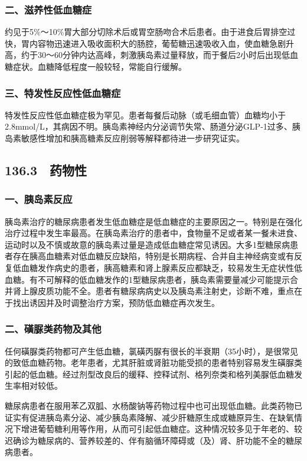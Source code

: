 \subsubsection{二、滋养性低血糖症}

约见于5\%～10\%胃大部分切除术后或胃空肠吻合术后患者。由于进食后胃排空过快，胃内容物迅速进入吸收面积大的肠腔，葡萄糖迅速吸收入血，使血糖急剧升高，约于30～60分钟内达高峰，刺激胰岛素过量释放，而于餐后2小时后出现低血糖症状。血糖降低程度一般较轻，常能自行缓解。

\subsubsection{三、特发性反应性低血糖症}

特发性反应性低血糖症极为罕见。患者每餐后动脉（或毛细血管）血糖均小于2.8mmol/L，其病因不明。胰岛素神经内分泌调节失常、肠道分泌GLP-1过多、胰岛素敏感性增加和胰高糖素反应削弱等解释都待进一步研究证实。

\subsection{136.3　药物性}

\subsubsection{一、胰岛素反应}

胰岛素治疗的糖尿病患者发生低血糖症是低血糖症的主要原因之一。特别是在强化治疗过程中发生率最高。在胰岛素治疗的患者中，食物量不足或者某一餐未进食、运动时以及不慎或故意的胰岛素过量是造成低血糖症常见诱因。大多1型糖尿病患者存在胰高血糖素对低血糖反应缺陷，特别是长期病程、合并自主神经病变或有反复低血糖发作病史的患者，胰高糖素和肾上腺素反应都缺乏，较易发生无症状性低血糖。有不可解释的低血糖发作的1型糖尿病患者，胰岛素需要量减少可能提示合并肾上腺皮质功能不全。患者有糖尿病病史以及胰岛素注射史，诊断不难，重点在于找出诱因并及时调整治疗方案，预防低血糖症再次发生。

\subsubsection{二、磺脲类药物及其他}

任何磺脲类药物都可产生低血糖，氯磺丙脲有很长的半衰期（35小时），是很常见的致低血糖药物。老年患者，尤其肝脏或肾脏功能受损的患者特别容易发生磺脲类引起的低血糖。经过剂型改良后的缓释、控释试剂、格列奈类和格列美脲低血糖发生率相对较低。

糖尿病患者在服用苯乙双胍、水杨酸钠等药物过程中也可出现低血糖。此类药物已证实有促进胰岛素分泌、减少胰岛素降解、减少肝糖原生成或糖原异生、在缺氧情况下增进葡萄糖利用等作用，从而可引起低血糖症。这种情况较多见于年老的、较迟确诊为糖尿病的、营养较差的、伴有脑循环障碍或（及）肾、肝功能不全的糖尿病患者。

